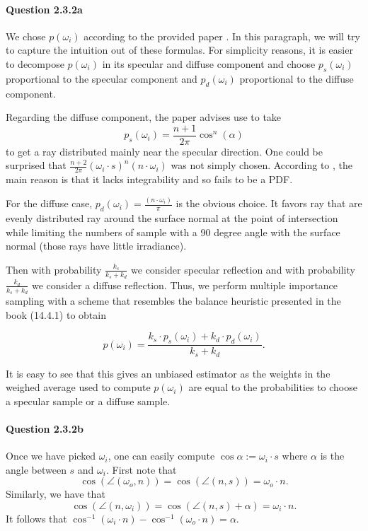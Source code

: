\documentclass{article}
\begin{document}
\paragraph{Question 2.3.2a}
We chose $p(\omega_i)$ according to the provided paper \cite{lawrence}. In this paragraph, we will try to capture the intuition out of these formulas. For simplicity reasons, it is easier to decompose $p(\omega_i)$ in its specular and diffuse component and choose $p_s(\omega_i)$ proportional to the specular component and $p_d(\omega_i)$ proportional to the diffuse component.

Regarding the diffuse component, the paper advises use to take $$p_s(\omega_i) = \frac{n+1}{2\pi}\cos^n(\alpha)$$ to get a ray distributed mainly near the specular direction.
One could be surprised that $\frac{n+2}{2\pi}(\omega_i \cdot s)^n(n \cdot \omega_i)$ was not simply chosen.
According to \cite{lafortune}, the main reason is that it lacks integrability and so fails to be a PDF.

For the diffuse case, $p_d(\omega_i) = \frac{(n \cdot \omega_i)}{\pi}$ is the obvious choice. It favors ray that are evenly distributed ray around the surface normal at the point of intersection while limiting the numbers of sample with a 90 degree angle with the surface normal (those rays have little irradiance). 

Then with probability $\frac{k_s}{k_s + k_d}$ we consider specular reflection and with probability $\frac{k_d}{k_s + k_d}$ we consider a diffuse reflection. Thus, we perform multiple importance sampling with a scheme that resembles the balance heuristic presented in the book (14.4.1) to obtain

$$p(\omega_i) = \frac{k_s \cdot p_s(\omega_i) + k_d \cdot p_d(\omega_i)}{k_s + k_d}.$$

It is easy to see that this gives an unbiased estimator as the weights in the weighed average used to compute $p(\omega_i)$ are equal to the probabilities to choose a specular sample or a diffuse sample.

\paragraph{Question 2.3.2b}Once we have picked $\omega_i$, one can easily compute\linebreak 
$\cos\alpha := \omega_i \cdot s$ where $\alpha$ is the angle between $s$ and $\omega_i$. First note that $$\cos \left (\angle(\omega_o, n)\right ) = \cos \left ( \angle(n,s) \right ) = \omega_o\cdot n.$$ Similarly, we have that
$$\cos\left(\angle (n, \omega_i)\right) = \cos\left(\angle(n,s) + \alpha\right) = \omega_i \cdot n.$$
It follows that $\cos^{-1}{\left(\omega_i \cdot n\right)} - \cos^{-1}{\left(\omega_o\cdot n\right)} = \alpha.$
\end{document}
